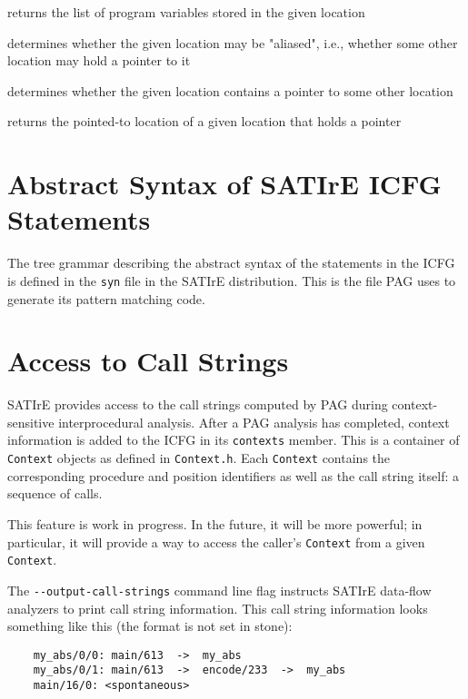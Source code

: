 \documentclass[a4paper,12pt]{report}
\begin{document}
\begin{description}
    returns the list of program variables stored in the given location

    determines whether the given location may be "aliased", i.e., whether
    some other location may hold a pointer to it

    determines whether the given location contains a pointer to some other
    location

    returns the pointed-to location of a given location that holds a pointer
\end{description}

\section{Abstract Syntax of SATIrE ICFG Statements}

The tree grammar describing the abstract syntax of the statements in the
ICFG is defined in the \texttt{syn} file in the SATIrE distribution. This is
the file PAG uses to generate its pattern matching code.

\section{Access to Call Strings}
\label{sec:call_strings}

SATIrE provides access to the call strings computed by PAG during
context-sensitive interprocedural analysis. After a PAG analysis has
completed, context information is added to the ICFG in its \texttt{contexts}
member. This is a container of \texttt{Context} objects as defined in
\verb|Context.h|. Each \texttt{Context} contains the corresponding procedure
and position identifiers as well as the call string itself: a sequence of
calls.

This feature is work in progress. In the future, it will be more powerful;
in particular, it will provide a way to access the caller's \texttt{Context}
from a given \texttt{Context}.

The \verb|--output-call-strings| command line flag instructs SATIrE
data-flow analyzers to print call string information. This call string
information looks something like this (the format is not set in stone):
\begin{verbatim}
    my_abs/0/0: main/613  ->  my_abs
    my_abs/0/1: main/613  ->  encode/233  ->  my_abs
    main/16/0: <spontaneous>
\end{verbatim}
\end{document}
